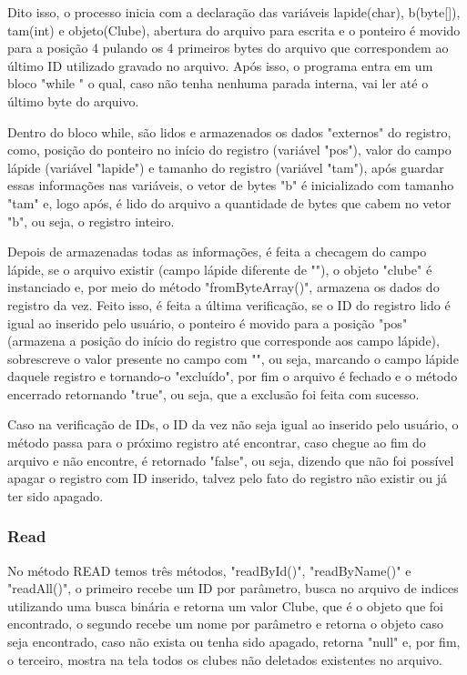 \documentclass[12pt]{article}
\begin{document}
Dito isso, o processo inicia com a declaração das variáveis lapide(char), b(byte[]), tam(int) e objeto(Clube), abertura do arquivo para escrita e o ponteiro é movido para a posição 4 pulando os 4 primeiros bytes do arquivo que correspondem ao último ID utilizado gravado no arquivo. Após isso, o programa entra em um bloco "while {}" o qual, caso não tenha nenhuma parada interna, vai ler até o último byte do arquivo. 

Dentro do bloco while, são lidos e armazenados os dados "externos" do registro, como, posição do ponteiro no início do registro (variável "pos"), valor do campo lápide (variável "lapide") e tamanho do registro (variável "tam"), após guardar essas informações nas variáveis, o vetor de bytes "b" é inicializado com tamanho "tam" e, logo após, é lido do arquivo a quantidade de bytes que cabem no vetor "b", ou seja, o registro inteiro. 

Depois de armazenadas todas as informações, é feita a checagem do campo lápide, se o arquivo existir (campo lápide diferente de ""), o objeto "clube" é instanciado e, por meio do método "fromByteArray()", armazena os dados do registro da vez. Feito isso, é feita a última verificação, se o ID do registro lido é igual ao inserido pelo usuário, o ponteiro é movido para a posição "pos" (armazena a posição do início do registro que corresponde aos campo lápide), sobrescreve o valor presente no campo com "", ou seja, marcando o campo lápide daquele registro e tornando-o "excluído", por fim o arquivo é fechado e o método encerrado retornando "true", ou seja, que a exclusão foi feita com sucesso.

Caso na verificação de IDs, o ID da vez não seja igual ao inserido pelo usuário, o método passa para o próximo registro até encontrar, caso chegue ao fim do arquivo e não encontre, é retornado "false", ou seja, dizendo que não foi possível apagar o registro com ID inserido, talvez pelo fato do registro não existir ou já ter sido apagado.

\subsubsection{Read}
No método READ temos três métodos, "readById()", "readByName()" e "readAll()", o primeiro recebe um ID por parâmetro, busca no arquivo de indices utilizando uma busca binária e retorna um valor Clube, que é o objeto que foi encontrado, o segundo recebe um nome por parâmetro e retorna o objeto caso seja encontrado, caso não exista ou tenha sido apagado, retorna "null" e, por fim, o terceiro, mostra na tela todos os clubes não deletados existentes no arquivo.
\end{document}
